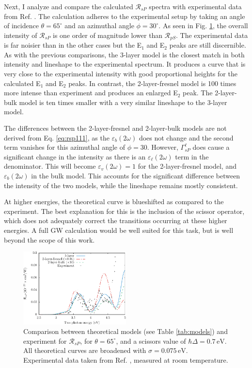 Next, I analyze and compare the calculated $\mathcal{R}_{sP}$ spectra with experimental data from Ref. \cite{mejiaPRB02}. The calculation adheres to the experimental setup by taking an angle of incidence $\theta=65^{\circ}$ and an azimuthal angle $\phi=30^\circ$. As seen in Fig. \ref{fig:RsP}, the overall intensity of $\mathcal{R}_{sP}$ is one order of magnitude lower than $\mathcal{R}_{pS}$. The experimental data is far noisier than in the other cases but the E$_{1}$ and E$_{2}$ peaks are still discernible. As with the previous comparisons, the 3-layer model is the closest match in both intensity and lineshape to the experimental spectrum. It produces a curve that is very close to the experimental intensity with good proportional heights for the calculated E$_{1}$ and E$_{2}$ peaks. In contrast, the 2-layer-fresnel model is 100 times more intense than experiment and produces an enlarged E$_{2}$ peak. The 2-layer-bulk model is ten times smaller with a very similar lineshape to the 3-layer model.

The differences between the 2-layer-fresnel and 2-layer-bulk models are not derived from Eq. \eqref{eq:rsp111}, as the $\varepsilon_{b}(2\omega)$ does not change and the second term vanishes for this azimuthal angle of $\phi = 30$. However, $\Gamma^{\ell}_{sP}$ does cause a significant change in the intensity as there is an $\varepsilon_{\ell}(2\omega)$ term in the denominator. This will become $\varepsilon_{v}(2\omega) = 1$ for the 2-layer-fresnel model, and $\varepsilon_{b}(2\omega)$ in the bulk model. This accounts for the significant difference between the intensity of the two models, while the lineshape remains mostly consistent.

At higher energies, the theoretical curve is blueshifted as compared to the experiment. The best explanation for this is the inclusion of the scissor operator, which does not adequately correct the transitions occurring at these higher energies. A full GW calculation would be well suited for this task, but is well beyond the scope of this work.

\begin{figure}[H]
\centering
\includegraphics[width=0.5\textwidth]{content/figures/fig-Si1x1-Mejia_RsP}
\caption{Comparison between theoretical models (see Table \ref{tab:models}) and experiment for $\mathcal{R}_{sP}$, for $\theta=65^{\circ}$, and a scissors value of $\hbar\Delta = 0.7\,\text{eV}$. All theoretical curves are broadened with $\sigma=0.075\,\text{eV}$. Experimental data taken from Ref. \cite{mejiaPRB02}, measured at room temperature.}
\label{fig:RsP}
\end{figure}


